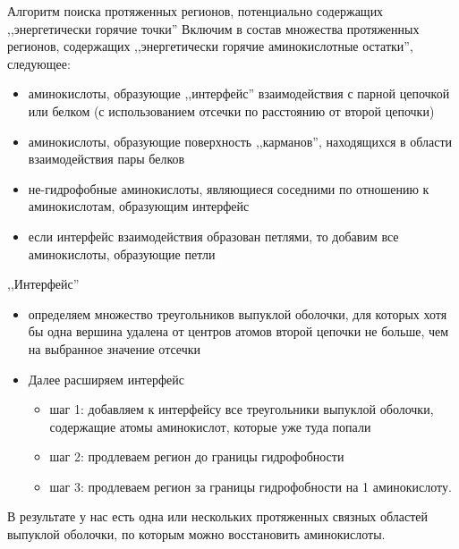 \documentclass[12pt, xcolor={dvipsnames}]{beamer}
\begin{document}
\begin{frame}{Алгоритм поиска протяженных регионов,}{ потенциально содержащих ,,энергетически горячие точки''}
Включим в состав множества протяженных регионов, содержащих ,,энергетически горячие аминокислотные остатки'', следующее:
\begin{itemize}
\item аминокислоты, образующие ,,интерфейс'' взаимодействия с парной цепочкой или белком (с использованием отсечки по расстоянию от второй цепочки)
\item аминокислоты, образующие поверхность ,,карманов'', находящихся в области взаимодействия пары белков
\item не-гидрофобные аминокислоты, являющиеся соседними по отношению к аминокислотам, образующим интерфейс
\item если интерфейс взаимодействия образован петлями, то добавим все аминокислоты, образующие петли 
\end{itemize}


\end{frame}
\begin{frame}{,,Интерфейс''}
\begin{itemize}
\item определяем множество треугольников выпуклой оболочки, для которых хотя бы одна вершина удалена от центров атомов второй цепочки не больше, чем на выбранное значение отсечки
\item Далее расширяем интерфейс
\begin{itemize}
\item шаг 1: добавляем к интерфейсу все треугольники выпуклой оболочки, содержащие атомы аминокислот, которые уже туда попали
\item шаг 2: продлеваем регион до границы гидрофобности
\item шаг 3: продлеваем регион за границы гидрофобности на 1 аминокислоту.
\end{itemize}
\end{itemize}


В результате у нас есть одна или нескольких протяженных связных областей выпуклой оболочки, по которым можно восстановить аминокислоты.
\end{frame}
\end{document}
